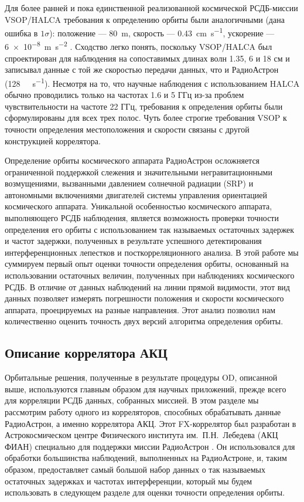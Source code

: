 Для более ранней и пока единственной реализованной космической РСДБ-миссии VSOP/HALCA требования
к определению орбиты были аналогичными (дана ошибка в $1\sigma$): положение --- \SI{80}{\meter},
скорость --- \SI{0.43}{\cm\per\second}, ускорение --- \SI{6e-8}{\meter\per\square\second}
\cite{You_1998}. Сходство легко понять, поскольку VSOP/HALCA был спроектирован для наблюдения на
сопоставимых длинах волн 1.35, 6 и 18 см и записывал данные с той же скоростью передачи данных, что
и РадиоАстрон (\SI{128}{\mega\bit\per\second}). Несмотря на то, что научные наблюдения с
использованием HALCA обычно проводились только на частотах 1.6 и 5 ГГц из-за проблем
чувствительности на частоте 22 ГГц, требования к определения орбиты были сформулированы для всех
трех полос. Чуть более строгие требования VSOP к точности определения местоположения и скорости
связаны с другой конструкцией коррелятора.

Определение орбиты космического аппарата РадиоАстрон осложняется ограниченной поддержкой слежения и
значительными негравитационными возмущениями, вызванными давлением солнечной радиации (SRP) и
автономными включениями двигателей системы управления ориентацией космического аппарата. Уникальной
особенностью космического аппарата, выполняющего РСДБ наблюдения, является возможность проверки
точности определения его орбиты с использованием так называемых остаточных задержек и частот
задержки, полученных в результате успешного детектирования интерференционных лепестков и
посткорреляционного анализа. В этой работе мы суммируем первый опыт оценки точности определения
орбиты, основанный на использовании остаточных величин, полученных при наблюдениях космического
РСДБ. В отличие от данных наблюдений на линии прямой видимости, этот вид данных позволяет измерять
погрешности положения и скорости космического аппарата, проецируемых на разные направления. Этот
анализ позволил нам количественно оценить точность двух версий алгоритма определения орбиты.

\subsection{Описание коррелятора АКЦ}

Орбитальные решения, полученные в результате процедуры OD, описанной выше, используются главным
образом для научных приложений, прежде всего для корреляции РСДБ данных, собранных миссией.
В этом разделе мы рассмотрим работу одного из корреляторов, способных обрабатывать данные
РадиоАстрон, а именно коррелятора АКЦ. Этот FX-коррелятор был разработан в Астрокосмическом центре
Физического института им.~П.Н.~Лебедева (АКЦ ФИАН) специально для поддержки миссии РадиоАстрон
\cite{Likhachev_2017}. Он использовался для обработки большинства наблюдений, выполненных на
РадиоАстроне, и, таким образом, предоставляет самый большой набор данных о так называемых остаточных
задержках и частотах интерференции, который мы будем использовать в следующем разделе для оценки
точности определения орбиты.

